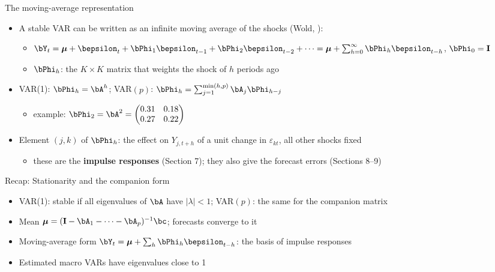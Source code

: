 \begin{frame}{The moving-average representation}
\itemsize{\small}
\begin{itemize}
    \item A stable VAR can be written as an infinite moving average of the shocks (Wold, ):
    \begin{itemize}
        \item $\bY_t = \boldsymbol{\mu} + \bepsilon_t + \bPhi_1\bepsilon_{t-1} + \bPhi_2\bepsilon_{t-2} + \dots = \boldsymbol{\mu} + \sum_{h=0}^{\infty}\bPhi_h\bepsilon_{t-h}$, $\bPhi_0 = \mathbf{I}$
        \item $\bPhi_h$: the $K \times K$ matrix that weights the shock of $h$ periods ago
    \end{itemize}
    \item VAR(1): $\bPhi_h = \bA^h$; VAR$(p)$: $\bPhi_h = \sum_{j=1}^{\min(h,p)}\bA_j\bPhi_{h-j}$
    \begin{itemize}
        \item example: $\bPhi_2 = \bA^2 = \begin{pmatrix} 0.31 & 0.18 \\ 0.27 & 0.22 \end{pmatrix}$
    \end{itemize}
    \item Element $(j, k)$ of $\bPhi_h$: the effect on $Y_{j,t+h}$ of a unit change in $\varepsilon_{kt}$, all other shocks fixed
    \begin{itemize}
        \item these are the \textbf{impulse responses} (Section 7); they also give the forecast errors (Sections 8--9)
    \end{itemize}
\end{itemize}
\end{frame}

\begin{frame}{Recap: Stationarity and the companion form}
\itemsize{\small}
\begin{itemize}
    \item VAR(1): stable if all eigenvalues of $\bA$ have $|\lambda| < 1$; VAR$(p)$: the same for the companion matrix
    \item Mean $\boldsymbol{\mu} = (\mathbf{I} - \bA_1 - \dots - \bA_p)^{-1}\bc$; forecasts converge to it
    \item Moving-average form $\bY_t = \boldsymbol{\mu} + \sum_h\bPhi_h\bepsilon_{t-h}$: the basis of impulse responses
    \item Estimated macro VARs have eigenvalues close to 1
\end{itemize}
\end{frame}


